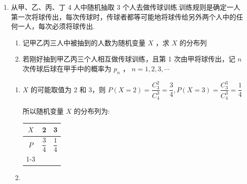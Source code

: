 \begin{enumerate}
\begin{enumerate}
\begin{jieda}
\begin{enumerate}
                所以 $P\left( {B \mid  M}\right)  = \dfrac{P\left( {BM}\right) }{P\left( M\right) } = \dfrac{{0.6} \times  \dfrac{1}{4}}{{0.6} \times  \dfrac{1}{4} + {0.15} \times  \dfrac{1}{5} + {0.05} \times  \dfrac{1}{6}} = \dfrac{90}{113}$ .
            \end{enumerate}
        \end{jieda}
        \item 从甲、乙、丙、丁 4 人中随机抽取 3 个人去做传球训练.训练规则是确定一人第一次将球传出，每次传球时，传球者都等可能地将球传给另外两个人中的任何一人，每次必须将球传出.
        \begin{enumerate}
            \item 记甲乙丙三人中被抽到的人数为随机变量 $X$ ，求 $X$ 的分布列
            \item 若刚好抽到甲乙丙三个人相互做传球训练，且第 1 次由甲将球传出，记 $n$ 次传球后球在甲手中的概率为 ${p}_{n}$ ， $n = 1,2,3,\cdots$ 
        \end{enumerate}
        \begin{jieda}
            \begin{enumerate}
                \item $X$ 的可能取值为 2 和 3，则 $P\left( {X = 2}\right)  = \dfrac{C_{3}^{2}}{C_{4}^{3}} = \dfrac{3}{4},P\left( {X = 3}\right)  = \dfrac{C_{3}^{3}}{C_{4}^{3}} = \dfrac{1}{4}$
                
                所以随机变量 $X$ 的分布列为:
                
                \begin{center}
                
                \begin{tabular}{|c|c|c|}
                \hline
                $X$ & 2 & 3 \\
                \hline
                $P$ & $\dfrac{3}{4}$ & $\dfrac{1}{4}$ \\
                \cline{1-3}
                \hline
                \end{tabular}
                
                \end{center}
                \item {}
\end{enumerate}
\end{jieda}
\end{enumerate}
\end{enumerate}
